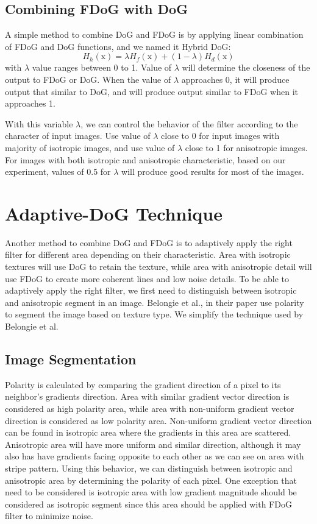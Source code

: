 \section{Combining FDoG with DoG}
A simple method to combine DoG and FDoG is by applying linear combination of FDoG and DoG functions, and we named it Hybrid DoG:
\begin{equation}
	H_{h}(\mbox{x}) = \lambda H_{f}(\mbox{x}) + (1 - \lambda) H_{d}(\mbox{x})
\end{equation}
with $\lambda$ value ranges between 0 to 1. Value of $\lambda$ will determine the closeness of the output to FDoG or DoG. When the value of $\lambda$ approaches 0, it will produce output that similar to DoG, and will produce output similar to FDoG when it approaches 1. 

With this variable $\lambda$, we can control the behavior of the filter according to the character of input images. Use value of $\lambda$ close to 0 for input images with majority of isotropic images, and use value of $\lambda$ close to 1 for anisotropic images. For images with both isotropic and anisotropic characteristic, based on our experiment, values of 0.5 for $\lambda$ will produce good results for most of the images.

\chapter{Adaptive-DoG Technique}
Another method to combine DoG and FDoG is to adaptively apply the right filter for different area depending on their characteristic. Area with isotropic textures will use DoG to retain the texture, while area with anisotropic detail will use FDoG to create more coherent lines and low noise details. To be able to adaptively apply the right filter, we first need to distinguish between isotropic and anisotropic segment in an image. Belongie et al., \cite{belongie98} in their paper use polarity to segment the image based on texture type. We simplify the technique used by Belongie et al.

\section{Image Segmentation} 
Polarity is calculated by comparing the gradient direction of a pixel to its neighbor's gradients direction. Area with similar gradient vector direction is considered as high polarity area, while area with non-uniform gradient vector direction is considered as low polarity area. Non-uniform gradient vector direction can be found in isotropic area where the gradients in this area are scattered. Anisotropic area will have more uniform and similar direction, although it may also has have gradients facing opposite to each other as we can see on area with stripe pattern. Using this behavior, we can distinguish between isotropic and anisotropic area by determining the polarity of each pixel. One exception that need to be considered is isotropic area with low gradient magnitude should be considered as isotropic segment since this area should be applied with FDoG filter to minimize noise.

